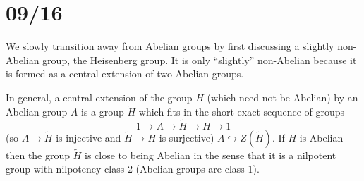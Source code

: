 \section{09/16}
We slowly transition away from Abelian groups by first discussing a slightly non-Abelian group, the Heisenberg group. It is only ``slightly'' non-Abelian because it is formed as a central extension of two Abelian groups. 

In general, a central extension of the group $H$ (which need not be Abelian) by an Abelian group $A$ is a group $\tilde H$ which fits in the short exact sequence of groups 
\[1\to A\to \widetilde H\to H \to 1\]
(so $A\to \widetilde H$ is injective and $\widetilde H \to H$ is surjective)  $A\hookrightarrow Z(\widetilde H)$. If $H$ is Abelian then the group $\widetilde H$ is close to being Abelian in the sense that it is a nilpotent group with nilpotency class $2$ (Abelian groups are class $1$).